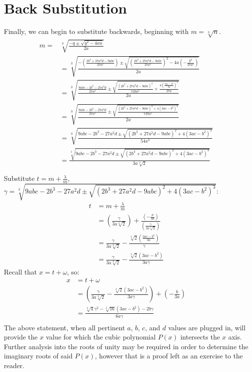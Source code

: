 \documentclass[12pt]{article}
\begin{document}
\section{Back Substitution}

Finally, we can begin to substitute backwards, beginning with $m=\sqrt[3]{n}$.
\begin{equation}
\begin{aligned}
m=&\sqrt[3]{\frac{-q\pm \sqrt{q^2-4au}}{2a}}\\
& = \sqrt[3]{\frac{-(\frac{2b^3+27a^2d-9abc}{27a^2})\pm \sqrt{(\frac{2b^3+27a^2d-9abc}{27a^2})^2-4a(-\frac{p^3}{27a^2})}}{2a}}\\
& = \sqrt[3]{\frac{\frac{9abc-2b^3-27a^2d}{27a^2}\pm \sqrt{\frac{(2b^3+27a^2d-9abc)^2}{729a^2}+\frac{4(\frac{3ac-b^2}{3a})^3}{27a}}}{2a}}\\
& = \sqrt[3]{\frac{\frac{9abc-2b^3-27a^2d}{27a^2}\pm \sqrt{\frac{(2b^3+27a^2d-9abc)^2+4(3ac-b^2)^3}{729a^2}}}{2a}}\\
& = \sqrt[3]{\frac{9abc-2b^3-27a^2d\pm \sqrt{(2b^3+27a^2d-9abc)^2+4(3ac-b^2)^3}}{54a^3}}\\
& = \frac{\sqrt[3]{9abc-2b^3-27a^2d\pm \sqrt{(2b^3+27a^2d-9abc)^2+4(3ac-b^2)^3}}}{3a\sqrt[3]{2}}\\ \\
\end{aligned}
\end{equation}
Substitute $t=m+\frac{\lambda}{m}$, $\gamma=\sqrt[3]{9abc-2b^3-27a^2d\pm \sqrt{(2b^3+27a^2d-9abc)^2+4(3ac-b^2)^3}}$:
\begin{equation}
\begin{aligned}
t&=m+\frac{\lambda}{m}\\
& = (\frac{\gamma}{3a\sqrt[3]{2}})+\frac{(-\frac{p}{3a})}{(\frac{\gamma}{3a\sqrt[3]{2}})}\\
& = \frac{\gamma}{3a\sqrt[3]{2}}-\frac{\sqrt[3]{2}(\frac{3ac-b^2}{3a})}{\gamma}\\
& = \frac{\gamma}{3a\sqrt[3]{2}}-\frac{\sqrt[3]{2}(3ac-b^2)}{3a\gamma}
\end{aligned}
\end{equation}
Recall that $x=t+\omega$, so:
\begin{equation}
\begin{aligned}
x&=t+\omega\\
& = (\frac{\gamma}{3a\sqrt[3]{2}}-\frac{\sqrt[3]{2}(3ac-b^2)}{3a\gamma})+(-\frac{b}{3a})\\
& = \frac{\sqrt[3]{4}\gamma^2-\sqrt[3]{16}(3ac-b^2)-2b\gamma}{6a\gamma}\\
\end{aligned}
\end{equation}
The above statement, when all pertinent $a$, $b$, $c$, and $d$ values are plugged in, will provide the $x$ value for which the cubic polynomial $P(x)$ intersects the $x$ axis. Further analysis into the roots of unity may be required in order to determine the imaginary roots of said $P(x)$, however that is a proof left as an exercise to the reader.
\end{document}
